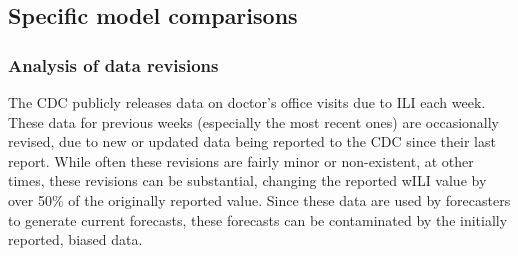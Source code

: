 \documentclass{article}
\begin{document}
% 


\subsection{Specific model comparisons}\label{sec:delay-model}

\subsubsection*{Analysis of data revisions}

The CDC publicly releases data on doctor's office visits due to ILI each week. 
These data for previous weeks (especially the most recent ones) are occasionally revised, due to new or updated data being reported to the CDC since their last report.
While often these revisions are fairly minor or non-existent, at other times, these revisions can be substantial, changing the reported wILI value by over 50\% of the originally reported value.
Since these data are used by forecasters to generate current forecasts, these forecasts can be contaminated by the initially reported, biased data.
\end{document}

